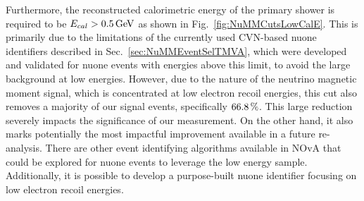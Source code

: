 Furthermore, the reconstructed calorimetric energy of the primary shower is required to be $E_{cal} > \unit[0.5]{GeV}$ as shown in Fig.~\ref{fig:NuMMCutsLowCalE}. This is primarily due to the limitations of the currently used \gls{CVN}-based \gls{nuone} identifiers described in Sec.~\ref{sec:NuMMEventSelTMVA}, which were developed and validated for \gls{nuone} events with energies above this limit, to avoid the large background at low energies. However, due to the nature of the neutrino magnetic moment signal, which is concentrated at low electron recoil energies, this cut also removes a majority of our signal events, specifically $\unit[66.8]{\%}$. This large reduction severely impacts the significance of our measurement. On the other hand, it also marks potentially the most impactful improvement available in a future re-analysis. There are other event identifying algorithms available in \gls{NOvA} that could be explored for \gls{nuone} events to leverage the low energy sample. Additionally, it is possible to develop a purpose-built \gls{nuone} identifier focusing on low electron recoil energies.

